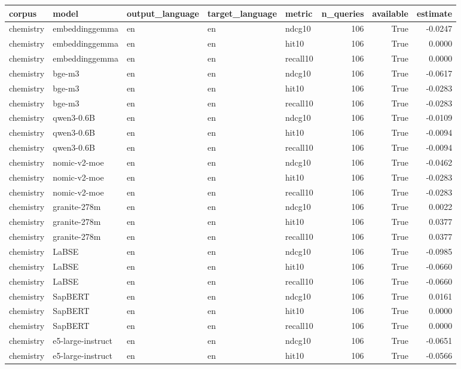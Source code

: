 \begin{tabular}{lllllrrr}
\toprule
corpus & model & output\_language & target\_language & metric & n\_queries & available & estimate \\
\midrule
chemistry & embeddinggemma & en & en & ndcg10 & 106 & True & -0.0247 \\
chemistry & embeddinggemma & en & en & hit10 & 106 & True & 0.0000 \\
chemistry & embeddinggemma & en & en & recall10 & 106 & True & 0.0000 \\
chemistry & bge-m3 & en & en & ndcg10 & 106 & True & -0.0617 \\
chemistry & bge-m3 & en & en & hit10 & 106 & True & -0.0283 \\
chemistry & bge-m3 & en & en & recall10 & 106 & True & -0.0283 \\
chemistry & qwen3-0.6B & en & en & ndcg10 & 106 & True & -0.0109 \\
chemistry & qwen3-0.6B & en & en & hit10 & 106 & True & -0.0094 \\
chemistry & qwen3-0.6B & en & en & recall10 & 106 & True & -0.0094 \\
chemistry & nomic-v2-moe & en & en & ndcg10 & 106 & True & -0.0462 \\
chemistry & nomic-v2-moe & en & en & hit10 & 106 & True & -0.0283 \\
chemistry & nomic-v2-moe & en & en & recall10 & 106 & True & -0.0283 \\
chemistry & granite-278m & en & en & ndcg10 & 106 & True & 0.0022 \\
chemistry & granite-278m & en & en & hit10 & 106 & True & 0.0377 \\
chemistry & granite-278m & en & en & recall10 & 106 & True & 0.0377 \\
chemistry & LaBSE & en & en & ndcg10 & 106 & True & -0.0985 \\
chemistry & LaBSE & en & en & hit10 & 106 & True & -0.0660 \\
chemistry & LaBSE & en & en & recall10 & 106 & True & -0.0660 \\
chemistry & SapBERT & en & en & ndcg10 & 106 & True & 0.0161 \\
chemistry & SapBERT & en & en & hit10 & 106 & True & 0.0000 \\
chemistry & SapBERT & en & en & recall10 & 106 & True & 0.0000 \\
chemistry & e5-large-instruct & en & en & ndcg10 & 106 & True & -0.0651 \\
chemistry & e5-large-instruct & en & en & hit10 & 106 & True & -0.0566 \\

\end{tabular}
